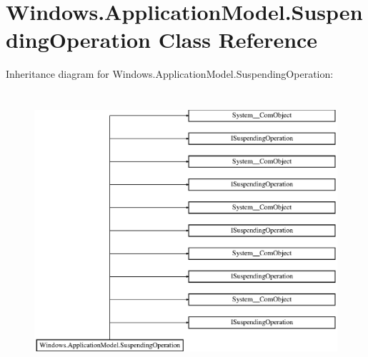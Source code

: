 \hypertarget{class_windows_1_1_application_model_1_1_suspending_operation}{}\section{Windows.\+Application\+Model.\+Suspending\+Operation Class Reference}
\label{class_windows_1_1_application_model_1_1_suspending_operation}
Inheritance diagram for Windows.\+Application\+Model.\+Suspending\+Operation\+:\begin{figure}[H]
\begin{center}
\leavevmode
\includegraphics[height=10.335571cm]{class_windows_1_1_application_model_1_1_suspending_operation}
\end{center}
\end{figure}
